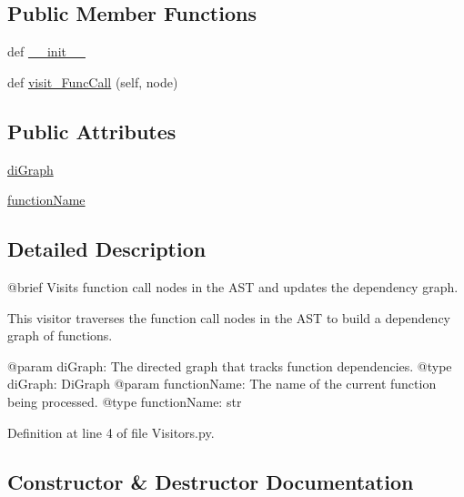 \subsection*{Public Member Functions}
\begin{DoxyCompactItemize}
\item 
def \hyperlink{classVisitors_1_1FunctionVisitor_ac775ee34451fdfa742b318538164070e}{\+\_\+\+\_\+init\+\_\+\+\_\+}
\item 
def \hyperlink{classVisitors_1_1FunctionVisitor_a48e7baeee3968db14598ff72b6be63bd}{visit\+\_\+\+Func\+Call} (self, node)
\end{DoxyCompactItemize}
\subsection*{Public Attributes}
\begin{DoxyCompactItemize}
\item 
\hyperlink{classVisitors_1_1FunctionVisitor_a773d3c032f7708247230d5a2e169fe4d}{di\+Graph}
\item 
\hyperlink{classVisitors_1_1FunctionVisitor_ab781b0aec3a9de0632eb6afda1e10288}{function\+Name}
\end{DoxyCompactItemize}


\subsection{Detailed Description}
\begin{DoxyVerb}@brief Visits function call nodes in the AST and updates the dependency graph.

This visitor traverses the function call nodes in the AST to build a dependency graph of functions.

@param diGraph: The directed graph that tracks function dependencies.
@type diGraph: DiGraph
@param functionName: The name of the current function being processed.
@type functionName: str
\end{DoxyVerb}
 

Definition at line 4 of file Visitors.\+py.



\subsection{Constructor \& Destructor Documentation}
\mbox{\label{classVisitors_1_1FunctionVisitor_ac775ee34451fdfa742b318538164070e}} 
